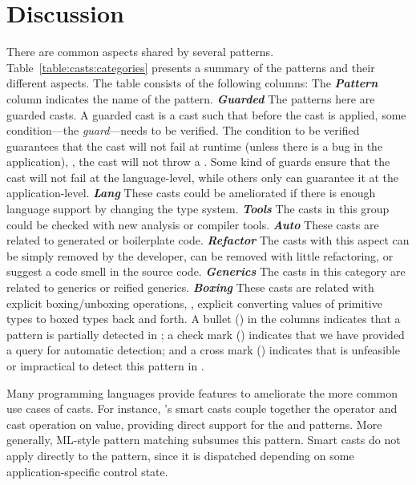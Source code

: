 \section{Discussion}\label{sec:casts:discussion}

\newcommand{\gh}[1]{\emph{\textbf{#1}}}
There are common aspects shared by several patterns.
Table~\ref{table:casts:categories} presents a summary of the patterns and their different aspects.
The table consists of the following columns:
The \gh{Pattern} column indicates the name of the pattern.
\gh{Guarded} The patterns here are guarded casts.
A guarded cast is a cast such that before the cast is applied,
some condition---the \emph{guard}---needs to be verified.
The condition to be verified guarantees that the cast will not fail at runtime (unless there is a bug in the application), \ie,
the cast will not throw a .
Some kind of guards ensure that the cast will not fail at the language-level,
while others only can guarantee it at the application-level.
\gh{Lang} These casts could be ameliorated if there is enough language support by changing the type system.
\gh{Tools} The casts in this group could be checked with new analysis or compiler tools.
\gh{Auto} These casts are related to generated or boilerplate code.
\gh{Refactor} The casts with this aspect can be simply removed by the developer,
can be removed with little refactoring,
or suggest a code smell in the source code.
\gh{Generics} The casts in this category are related to generics or reified generics.
\gh{Boxing} These casts are related with explicit boxing/unboxing operations, \ie{},
explicit converting values of primitive types to boxed types back and forth.
\gh{\ql{}}
A bullet (\exis{}) in the \ql{} columns indicates that a pattern is partially detected in \ql{};
a check mark (\tick{}) indicates that we have provided a \ql{} query for automatic detection; and
a cross mark (\xmark{}) indicates that is unfeasible or impractical to detect this pattern in \ql{}.



Many programming languages provide features to ameliorate the more common use cases of casts.
For instance,
\kotlin{}'s smart casts couple together the  operator and cast operation on value, 
providing direct support for the  and  patterns.
More generally, ML-style pattern matching subsumes this pattern.
Smart casts do not apply directly to the  pattern,
since it is dispatched depending on some application-specific control state.

